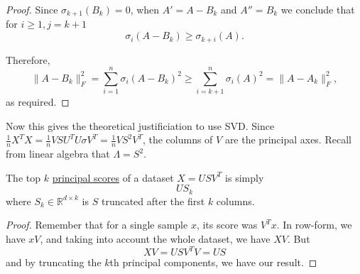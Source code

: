 \begin{proof}
    Since $\sigma_{k+1}(B_k) = 0$, when $A' = A - B_k$ and $A'' = B_k$ we conclude that for $i \geq 1, j = k + 1$
    \begin{equation}
      \sigma_i(A - B_k) \geq \sigma_{k+i}(A).
    \end{equation}

    Therefore,
    \begin{equation}
      \|A - B_k\|_F^2 = \sum_{i=1}^n \sigma_i(A - B_k)^2 \geq \sum_{i=k+1}^n \sigma_i(A)^2 = \|A - A_k\|_F^2,
    \end{equation}
    as required.
  \end{proof}

  Now this gives the theoretical justificiation to use SVD. Since $\frac{1}{n} X^T X = \frac{1}{n} V S U^T U \sigma V^T = \frac{1}{n} V S^2 V^T$, the columns of $V$ are the principal axes. Recall from linear algebra that $\Lambda = S^2$. 

  \begin{theorem}
    \label{thm:principal-scores}
    The top $k$ \hyperref[def:principal-scores]{principal scores} of a dataset $X = U S V^T$ is simply  
    \begin{equation}
      U S_k
    \end{equation}
    where $S_k \in \mathbb{R}^{d \times k}$ is $S$ truncated after the first $k$ columns. 
  \end{theorem}
  \begin{proof}
    Remember that for a single sample $x$, its score was $V^T x$. In row-form, we have $x V$, and taking into account the whole dataset, we have $XV$. But 
    \begin{equation}
      XV = U S V^T V = US
    \end{equation}
    and by truncating the $k$th principal components, we have our result.  
  \end{proof}

